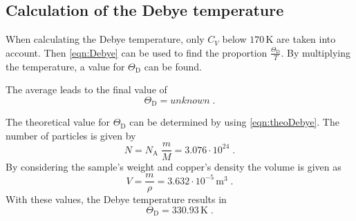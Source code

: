 \subsection{Calculation of the Debye temperature}%

When calculating the Debye temperature, only $C_{{V}}$ below $170\, \unit{\kelvin}$ are taken into account.
Then \autoref{eqn:Debye} can be used to find the proportion $\frac{\Theta_{\text{D}}}{T}$.
By multiplying the temperature, a value for $\Theta _{\text{D}}$ can be found.



The average leads to the final value of
\begin{equation*}
    \Theta _{\text{D}}= unknown     \; .
\end{equation*}

The theoretical value for $\Theta _{\text{D}}$ can be determined by using \autoref{eqn:theoDebye}.
The number of particles is given by 
\begin{equation*}
    N=N_{\text{A}}\; \frac{m}{M}=3.076 \cdot 10^{24}\; .
\end{equation*}
By considering the sample's weight and copper's density the volume is given as 
\begin{equation*}
    V=\frac{m}{\rho}=3.632 \cdot 10^{-5} \, \unit{\meter}^3\; .
\end{equation*}
With these values, the Debye temperature results in
\begin{equation*}
    \Theta_{\text{D}}=330.93\, \unit{\kelvin}\; .
\end{equation*}